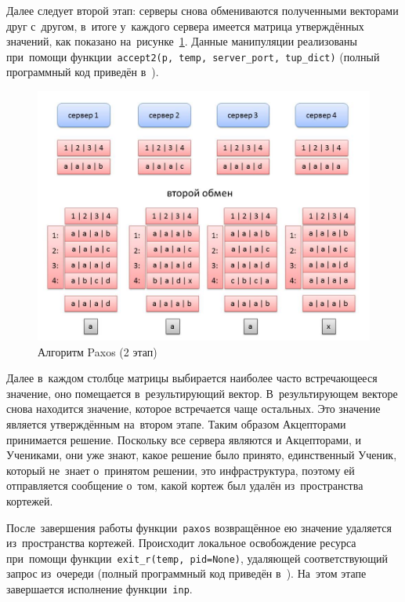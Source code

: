 Далее следует второй этап: серверы снова обмениваются полученными векторами друг с~другом, в~итоге у~каждого сервера имеется матрица утверждённых значений, как показано на~рисунке~\ref{paxosjpg2}. Данные манипуляции реализованы при~помощи функции~\texttt{accept2(p, temp, server_port, tup_dict)} (полный программный код приведён в~\autocite{mybts}).
\begin{figure}
	\centering \includegraphics[width=0.8 \textwidth, height=0.6 \textwidth]{img/paxos2}  \caption{Алгоритм Paxos (2 этап)} \label{paxosjpg2}
\end{figure}
Далее в~каждом столбце матрицы выбирается наиболее часто встречающееся значение, оно помещается в~результирующий вектор. В~результирующем векторе снова находится значение, которое встречается чаще остальных. Это значение является утверждённым на~втором этапе. Таким образом Акцепторами принимается решение. Поскольку все сервера являются и Акцепторами, и Учениками, они уже знают, какое решение было принято, единственный Ученик, который не~знает о~принятом решении, это инфраструктура, поэтому ей отправляется сообщение о~том, какой кортеж был удалён из~пространства кортежей.

После~завершения работы функции~\texttt{paxos} возвращённое ею значение удаляется из~пространства кортежей. Происходит локальное освобождение ресурса при~помощи функции~\texttt{exit_r(temp, pid=None)}, удаляющей соответствующий запрос из~очереди (полный программный код приведён в~\autocite{mybts}). На~этом этапе завершается исполнение функции~\texttt{inp}.


